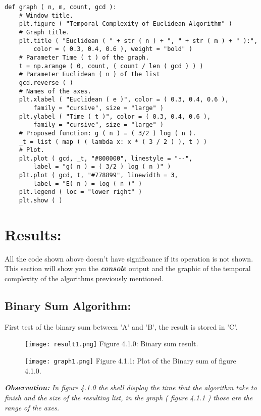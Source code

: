 \documentclass[10pt,a4paper]{article}
\begin{document}
\begin{lstlisting}
def graph ( n, m, count, gcd ):
    # Window title.
    plt.figure ( "Temporal Complexity of Euclidean Algorithm" )
    # Graph title.
    plt.title ( "Euclidean ( " + str ( n ) + ", " + str ( m ) + " ):", 
    	color = ( 0.3, 0.4, 0.6 ), weight = "bold" )
    # Parameter Time ( t ) of the graph.
    t = np.arange ( 0, count, ( count / len ( gcd ) ) )
    # Parameter Euclidean ( n ) of the list
    gcd.reverse ( )
    # Names of the axes.
    plt.xlabel ( "Euclidean ( e )", color = ( 0.3, 0.4, 0.6 ), 
    	family = "cursive", size = "large" )
    plt.ylabel ( "Time ( t )", color = ( 0.3, 0.4, 0.6 ), 
    	family = "cursive", size = "large" )
    # Proposed function: g ( n ) = ( 3/2 ) log ( n ).
    _t = list ( map ( ( lambda x: x * ( 3 / 2 ) ), t ) )
    # Plot.
    plt.plot ( gcd, _t, "#800000", linestyle = "--", 
    	label = "g( n ) = ( 3/2 ) log ( n )" )
    plt.plot ( gcd, t, "#778899", linewidth = 3, 
    	label = "E( n ) = log ( n )" )
    plt.legend ( loc = "lower right" )
    plt.show ( )
\end{lstlisting}
\pagebreak

\section{Results:}

All the code shown above doesn't have significance if its operation is not shown. This section will show you the {\bfseries\itshape console} output and the graphic of the temporal complexity of the algorithms previously mentioned.

\subsection{Binary Sum Algorithm:}

First test of the binary sum between 'A' and 'B', the result is stored in 'C'.

\begin{figure}[H]
\texttt{[image: result1.png]}
\centering \linebreak \linebreak Figure 4.1.0: Binary sum result.
\end{figure}

\begin{multicols}{2}
\begin{figure}[H]
\texttt{[image: graph1.png]}
\centering \linebreak \linebreak Figure 4.1.1: Plot of the Binary sum of figure 4.1.0.
\end{figure}
\hfill \break

{\bfseries\itshape Observation:} {\itshape In figure 4.1.0 the shell display the time that the algorithm take to finish and the size of the resulting list, in the graph ( figure 4.1.1 ) those are the range of the axes.}
\end{multicols}
\end{document}
